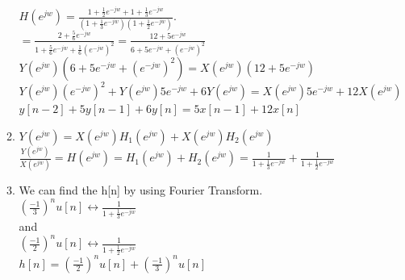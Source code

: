 \documentclass[10pt,a4paper, margin=1in]{article}
\begin{document}
\begin{enumerate}
\begin{enumerate}
              $H(e^{jw}) = \frac{1 + \frac{1}{2}e^{-jw} + 1 + \frac{1}{3}e^{-jw}}{(1 + \frac{1}{3}e^{-jw})(1 + \frac{1}{2}e^{-jw})}.$ \\

              $= \frac{2 + \frac{5}{6} e^{-jw}}{1+ \frac{5}{6}e^{-jw}+\frac{1}{6}(e^{-jw})^2} = \frac{12 + 5e^{-jw}}{6+5e^{-jw}+(e^{-jw})^2}$ \\

              $Y(e^{jw}) (6+5e^{-jw}+(e^{-jw})^2) = X(e^{jw}) (12 + 5e^{-jw})$ \\

              $Y(e^{jw}) (e^{-jw})^2 + Y(e^{jw}) 5e^{-jw}+ 6Y(e^{jw}) = X(e^{jw}) 5e^{-jw}+ 12X(e^{jw})$ \\

              $y[n-2] + 5y[n-1] +6y[n] = 5x[n-1] + 12x[n]$
            
              \item %
              $Y(e^{jw}) = X(e^{jw}) H_1(e^{jw}) + X(e^{jw}) H_2(e^{jw})$ \\

              $\frac{Y(e^{jw})}{X(e^{jw})} = H(e^{jw}) = H_1(e^{jw}) + H_2(e^{jw}) = \frac{1}{1 + \frac{1}{3}e^{-jw}} + \frac{1}{1 + \frac{1}{2}e^{-jw}}$ \\
              \item %
              We can find the h[n] by using Fourier Transform. \\
              $(\frac{-1}{3})^nu[n] \leftrightarrow \frac{1}{1 + \frac{1}{3}e^{-jw}}$ \\
              
              and \\

              $(\frac{-1}{2})^nu[n] \leftrightarrow \frac{1}{1 + \frac{1}{2}e^{-jw}}$ \\

              $h[n] = (\frac{-1}{2})^nu[n] + (\frac{-1}{3})^nu[n]$

          \end{enumerate}


\end{enumerate}
\end{document}
